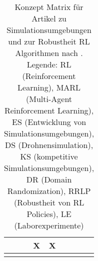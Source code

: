 \begin{longtable}{|l|llllllll|}
    \cite[]{Panerati.332021}      & \multicolumn{1}{l|}{}   & \multicolumn{1}{l|}{}    & \multicolumn{1}{l|}{X}   & \multicolumn{1}{l|}{X}   & \multicolumn{1}{l|}{}   & \multicolumn{1}{l|}{}   & \multicolumn{1}{l|}{}     &    \\ \hline
    \caption{Konzept Matrix für Artikel zu Simulationsumgebungen und zur Robustheit RL Algorithmen nach \cite[]{10.5555/2017160.2017162}.
    Legende: RL (Reinforcement Learning), MARL (Multi-Agent Reinforcement Learning), ES (Entwicklung von Simulationsumgebungen), DS (Drohnensimulation), KS (kompetitive Simulationsumgebungen), DR (Domain Randomization), RRLP (Robustheit von RL Policies), LE (Laborexperimente)}
    \label{tab:research-table}\\
\end{longtable}